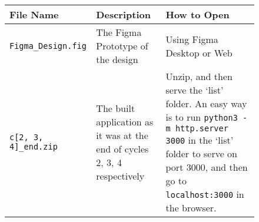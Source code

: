 
\begin{figure}[h]
    \centering
    \begin{tabular}{|m{4cm}|p{5cm}|>{\raggedright\arraybackslash}p{5.5cm}|}
        \hline \textbf{File Name} & \textbf{Description} & \textbf{How to Open} \\ \hline
        \verb|Figma_Design.fig| & The Figma Prototype of the design & Using Figma Desktop or Web\\ \hline
        \verb|c[2, 3, 4]_end.zip| & The built application as it was at the end of cycles 2, 3, 4 respectively & Unzip, and then serve the `list' folder. \newline An easy way is to run \verb|python3 -m http.server 3000| in the `list' folder to serve on port 3000, and then go to \verb|localhost:3000| in the browser. \\ \hline
    \end{tabular}
\end{figure}
